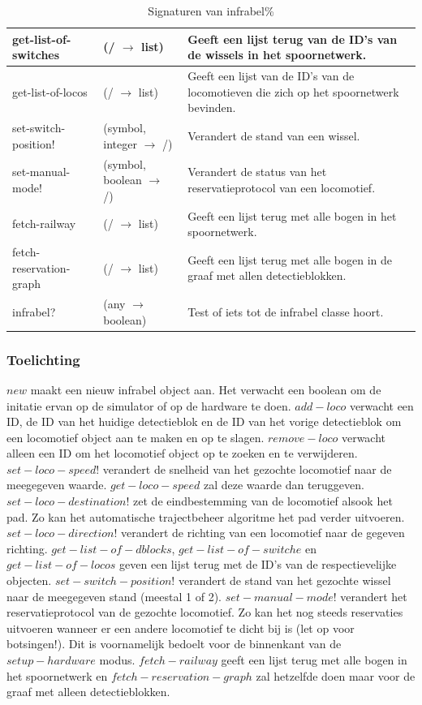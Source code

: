 \documentclass{article}
\begin{document}
\begin{table}[h!]
\begin{tabular}{|p{2.9cm}|p{4cm}|p{6.1cm}|}
                \hline
                get-list-of-switches & (/ $\rightarrow$ list) & Geeft een lijst terug van de ID's van de wissels in het spoornetwerk. \\
                \hline
                get-list-of-locos & (/ $\rightarrow$ list) & Geeft een lijst van de ID's van de locomotieven die zich op het spoornetwerk bevinden.\\
                \hline
                set-switch-position! & (symbol, integer $\rightarrow$ /) & Verandert de stand van een wissel.\\
                \hline
                set-manual-mode! & (symbol, boolean $\rightarrow$ /) & Verandert de status van het reservatieprotocol van een locomotief.\\
                \hline
                fetch-railway & (/ $\rightarrow$ list) & Geeft een lijst terug met alle bogen in het spoornetwerk.\\
                \hline
                fetch-reservation-graph & (/ $\rightarrow$ list) & Geeft een lijst terug met alle bogen in de graaf met allen detectieblokken.\\
                \hline
                infrabel? & (any $\rightarrow$ boolean) & Test of iets tot de infrabel classe hoort.\\
                \hline
        \end{tabular}
        \caption{Signaturen van infrabel\%}
\end{table}
\subsubsection{Toelichting}
$new$ maakt een nieuw infrabel object aan. Het verwacht een boolean om de initatie ervan op de simulator of op de hardware te doen. $add-loco$ verwacht een ID, de ID van het huidige detectieblok en de ID van het vorige detectieblok
om een locomotief object aan te maken en op te slagen. $remove-loco$ verwacht alleen een ID om het locomotief object op te zoeken en te verwijderen. $set-loco-speed!$ verandert de snelheid van het gezochte locomotief naar de meegegeven waarde.
$get-loco-speed$ zal deze waarde dan teruggeven. $set-loco-destination!$ zet de eindbestemming van de locomotief alsook het pad. Zo kan het automatische trajectbeheer algoritme het pad verder uitvoeren. $set-loco-direction!$ verandert de richting van een locomotief naar de gegeven richting. 
$get-list-of-dblocks$, $get-list-of-switche$ en $get-list-of-locos$ geven een lijst terug met de ID's van de respectievelijke objecten. $set-switch-position!$ verandert de stand van het gezochte wissel naar de meegegeven stand (meestal 1 of 2). 
$set-manual-mode!$ verandert het reservatieprotocol van de gezochte locomotief. Zo kan het nog steeds reservaties uitvoeren wanneer er een
andere locomotief te dicht bij is (let op voor botsingen!). Dit is voornamelijk bedoelt voor de binnenkant van de $setup-hardware$ modus. $fetch-railway$ geeft een lijst terug met alle bogen in het spoornetwerk en $fetch-reservation-graph$ zal hetzelfde doen
maar voor de graaf met alleen detectieblokken. 
\end{document}

